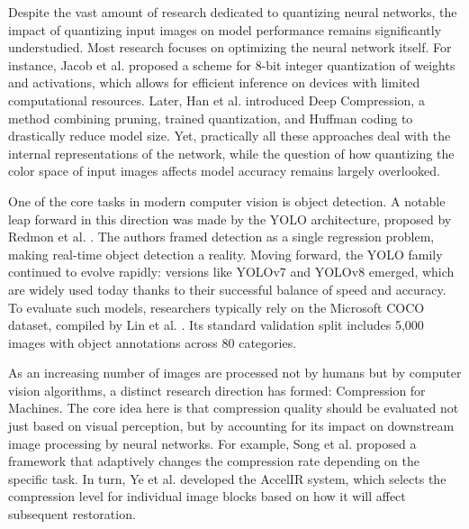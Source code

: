 \documentclass[12pt, a4paper]{article}
\begin{document}
Despite the vast amount of research dedicated to quantizing neural networks, the impact of quantizing input images on model performance remains significantly understudied. Most research focuses on optimizing the neural network itself. For instance, Jacob et al. \cite{jacob2018} proposed a scheme for 8-bit integer quantization of weights and activations, which allows for efficient inference on devices with limited computational resources. Later, Han et al. \cite{han2016} introduced Deep Compression, a method combining pruning, trained quantization, and Huffman coding to drastically reduce model size. Yet, practically all these approaches deal with the internal representations of the network, while the question of how quantizing the color space of input images affects model accuracy remains largely overlooked.

One of the core tasks in modern computer vision is object detection. A notable leap forward in this direction was made by the YOLO architecture, proposed by Redmon et al. \cite{redmon2016}. The authors framed detection as a single regression problem, making real-time object detection a reality. Moving forward, the YOLO family continued to evolve rapidly: versions like YOLOv7 \cite{wang2023} and YOLOv8 \cite{jocher2023} emerged, which are widely used today thanks to their successful balance of speed and accuracy. To evaluate such models, researchers typically rely on the Microsoft COCO dataset, compiled by Lin et al. \cite{lin2014}. Its standard validation split includes 5,000 images with object annotations across 80 categories.

As an increasing number of images are processed not by humans but by computer vision algorithms, a distinct research direction has formed: Compression for Machines. The core idea here is that compression quality should be evaluated not just based on visual perception, but by accounting for its impact on downstream image processing by neural networks. For example, Song et al. \cite{song2021} proposed a framework that adaptively changes the compression rate depending on the specific task. In turn, Ye et al. \cite{ye2023} developed the AccelIR system, which selects the compression level for individual image blocks based on how it will affect subsequent restoration.
\end{document}
